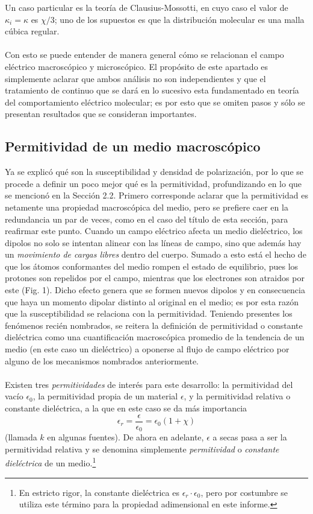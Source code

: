 \documentclass[12pt, oneside, numbers, spanish]{ezthesis}
\numberwithin{equation}{section}
\begin{document}
Un caso particular es la teoría de Clausius-Mossotti, en cuyo caso el valor de $\kappa_i = \kappa$ es $\chi/3$; uno de los supuestos es que la distribución molecular es una malla cúbica regular.\\\\
Con esto se puede entender de manera general cómo se relacionan el campo eléctrico macroscópico y microscópico. El propósito de este apartado es simplemente aclarar que ambos análisis no son independientes y que el tratamiento de continuo que se dará en lo sucesivo esta fundamentado en teoría del comportamiento eléctrico molecular; es por esto que se omiten pasos y sólo se presentan resultados que se consideran importantes.

\subsection{Permitividad de un medio macroscópico}
Ya se explicó qué son la susceptibilidad y densidad de polarización, por lo que se procede a definir un poco mejor qué es la permitividad, profundizando en lo que se mencionó en la Sección 2.2.
Primero corresponde aclarar que la permitividad es netamente una propiedad macroscópica del medio, pero se prefiere caer en la redundancia un par de veces, como en el caso del título de esta sección, para reafirmar este punto. Cuando un campo eléctrico afecta un medio dieléctrico, los dipolos no solo se intentan alinear con las líneas de campo, sino que además hay un \textit{movimiento de cargas libres} dentro del cuerpo. Sumado a esto está el hecho de que los átomos conformantes del medio rompen el estado de equilibrio, pues los protones son repelidos por el campo, mientras que los electrones son atraidos por este (Fig. 1). Dicho efecto genera que se formen nuevos dipolos y en consecuencia que haya un momento dipolar distinto al original en el medio; es por esta razón que la susceptibilidad se relaciona con la permitividad. Teniendo presentes los fenómenos recién nombrados, se reitera la definición de permitividad o constante dieléctrica como una cuantificación macroscópica promedio de la tendencia de un medio (en este caso un dieléctrico) a oponerse al flujo de campo eléctrico por alguno de los mecanismos nombrados anteriormente.\\\\
Existen tres \textit{permitividades} de interés para este desarrollo: la permitividad del vacío $\epsilon_0$, la permitividad propia de un material $\epsilon$, y la permitividad relativa o constante dieléctrica, a la que en este caso se da más importancia
\begin{equation}
\epsilon_r = \frac{\epsilon}{\epsilon_0}=\epsilon_0(1+\chi)
\end{equation}
(llamada $k$ en algunas fuentes). De ahora en adelante, $\epsilon$ a secas pasa a ser la permitividad relativa y se denomina simplemente \textit{permitividad} o \textit{constante dieléctrica} de un medio.\footnote{En estricto rigor, la constante dieléctrica es $\epsilon_r\cdot\epsilon_0$, pero por costumbre se utiliza este término para la propiedad adimensional en este informe.}
\end{document}
